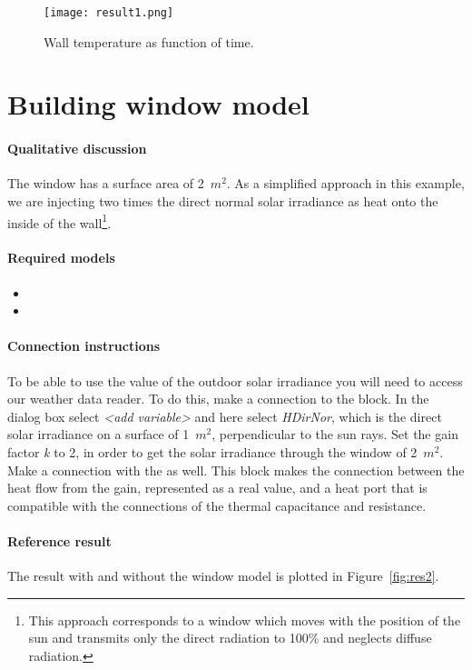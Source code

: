 \documentclass[10pt,a4paper]{article}
\begin{document}
\begin{figure}[h!]
\centering
\texttt{[image: result1.png]}
\caption{Wall temperature as function of time.}
\label{fig:res1}
\end{figure}

\newpage

\section{Building window model}
\paragraph{Qualitative discussion}
The window has a surface area of 2~$m^2$. 
As a simplified approach in this example, we are injecting two times the direct normal solar irradiance as heat onto the inside of the wall\footnote{This approach corresponds to a window which moves with the position of the sun and transmits only the direct radiation to 100\% and neglects diffuse radiation.}.

\paragraph{Required models}
\begin{itemize}
\item {}
\item {}
\end{itemize}

\paragraph{Connection instructions}
To be able to use the value of the outdoor solar irradiance
you will need to access our weather data reader.
To do this, make a connection to the  block. 
In the dialog box select \textit{\textless add variable\textgreater} and here
select \textit{HDirNor}, 
which is the direct solar irradiance on a surface
of 1~$m^2$, perpendicular to the sun rays. Set the gain factor \textit{k} to 2, in order to get the solar irradiance through the window of 2~$m^2$. Make a connection with the  as well. This block makes the connection between the heat flow from the gain, represented as a real value, and a heat port that is compatible with the connections of the thermal capacitance and resistance. 

\paragraph{Reference result}
The result with and without the window model
is plotted in Figure~\ref{fig:res2}.
\end{document}
